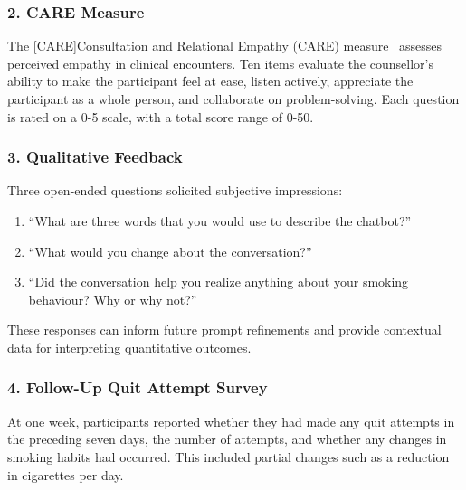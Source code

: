 \subsubsection{2. CARE Measure}
\label{subsec:care}
The [CARE]Consultation and Relational Empathy (CARE) measure~\citep{mercer2004consultation,bikker2015measuring} assesses perceived empathy in clinical encounters. Ten items evaluate the counsellor's ability to make the participant feel at ease, listen actively, appreciate the participant as a whole person, and collaborate on problem-solving. Each question is rated on a 0-5 scale, with a total score range of 0-50.

\subsubsection{3. Qualitative Feedback}
Three open-ended questions solicited subjective impressions:
\begin{enumerate}
    \item ``What are three words that you would use to describe the chatbot?''
    \item ``What would you change about the conversation?''
    \item ``Did the conversation help you realize anything about your smoking behaviour? Why or why not?''
\end{enumerate}
These responses can inform future prompt refinements and provide contextual data for interpreting quantitative outcomes.

\subsubsection{4. Follow-Up Quit Attempt Survey}
At one week, participants reported whether they had made any quit attempts in the preceding seven days, the number of attempts, and whether any changes in smoking habits had occurred. This included partial changes such as a reduction in cigarettes per day.

